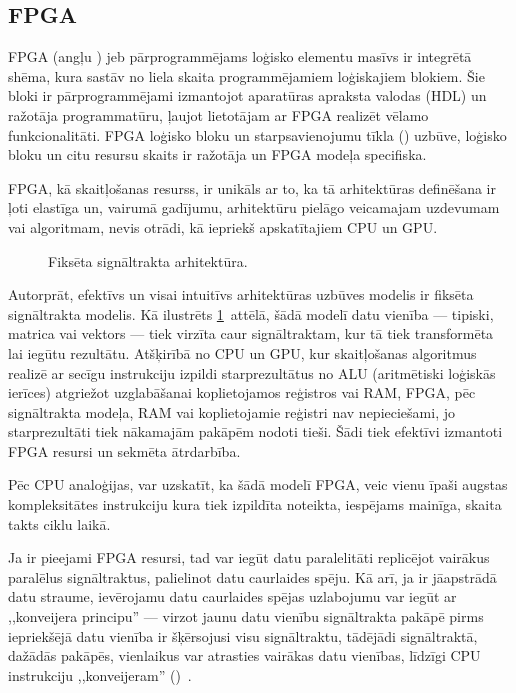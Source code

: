 \subsection{FPGA} \label{sec:fpga}
FPGA (angļu ) jeb
pārprogrammējams loģisko elementu masīvs ir integrētā shēma, kura sastāv no
liela skaita programmējamiem loģiskajiem blokiem. Šie bloki ir pārprogrammējami
izmantojot aparatūras apraksta valodas (HDL) un ražotāja programmatūru,
ļaujot lietotājam ar FPGA realizēt vēlamo funkcionalitāti.
FPGA loģisko bloku un starpsavienojumu tīkla ()
uzbūve, loģisko bloku un citu resursu skaits ir ražotāja un
FPGA modeļa specifiska.\cite{JIS}

FPGA, kā skaitļošanas resurss, ir unikāls ar to, ka tā arhitektūras definēšana
ir ļoti elastīga un, vairumā gadījumu, arhitektūru pielāgo veicamajam
uzdevumam vai algoritmam, nevis otrādi, kā iepriekš apskatītajiem CPU un GPU.

\begin{figure}[tbh]
	\centering
	\def\svgscale{1.2}
	{}
	\caption{Fiksēta signāltrakta arhitektūra.}
	\label{fig:fpga-arch}
\end{figure}
Autorprāt, efektīvs un visai intuitīvs arhitektūras uzbūves modelis ir
fiksēta signāltrakta modelis. Kā ilustrēts \ref{fig:fpga-arch}~attēlā, šādā
modelī datu vienība --- tipiski, matrica vai vektors --- tiek virzīta caur
signāltraktam, kur tā tiek transformēta lai iegūtu rezultātu. Atšķirībā no
CPU un GPU, kur skaitļošanas algoritmus realizē ar secīgu instrukciju izpildi
starprezultātus no ALU (aritmētiski loģiskās ierīces)
atgriežot uzglabāšanai koplietojamos reģistros vai RAM,
FPGA, pēc signāltrakta modeļa, RAM vai koplietojamie reģistri nav
nepieciešami, jo starprezultāti tiek nākamajām pakāpēm nodoti tieši.
Šādi tiek efektīvi izmantoti FPGA resursi un sekmēta ātrdarbība.

Pēc CPU analoģijas, var uzskatīt, ka šādā modelī FPGA, veic vienu
īpaši augstas kompleksitātes instrukciju kura tiek izpildīta noteikta,
iespējams mainīga, skaita takts ciklu laikā.

Ja ir pieejami FPGA resursi, tad var iegūt datu paralelitāti replicējot 
vairākus paralēlus signāltraktus, palielinot datu caurlaides spēju. Kā arī, ja ir
jāapstrādā datu straume, ievērojamu datu caurlaides spējas uzlabojumu var
iegūt ar ,,konveijera principu'' --- virzot jaunu datu vienību
signāltrakta pakāpē pirms iepriekšējā datu vienība ir šķērsojusi visu
signāltraktu, tādējādi signāltraktā, dažādās pakāpēs, vienlaikus
var atrasties vairākas datu vienības, līdzīgi CPU instrukciju ,,konveijeram''
()~\cite{Flynn-arch}.
